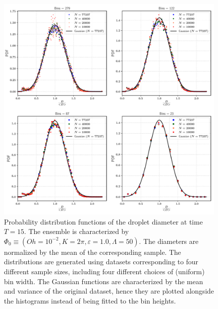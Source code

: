 \begin{figure}
\centering
\includegraphics{plots/drop_stats/short_time_diameter_bins.pdf}
\caption{Probability distribution functions of the droplet diameter at time $T = 15$. 
The ensemble is characterized by $\Phi_0 \equiv \left( Oh = 10^{-2}, K = 2\pi , \varepsilon = 1.0 , \Lambda = 50 \right)$. 
The diameters are normalized by the mean of the corresponding sample.  
The distributions are generated using datasets corresponding to four different sample sizes, 
including four different choices of (uniform) bin width. 
The Gaussian functions are characterized by the mean and variance of the original dataset, 
hence they are plotted alongside the histograms instead of being fitted to the bin heights.
	}
\label{t1_dia_bins}
\end{figure}




